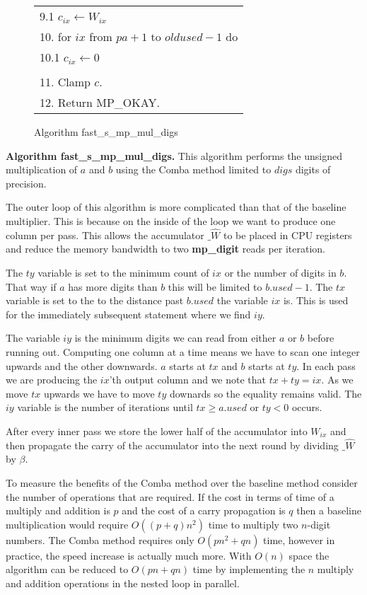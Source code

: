\documentclass[b5paper]{book}
\begin{document}
\begin{figure}[!here]
\begin{small}
\begin{center}
\begin{tabular}{l}
\hspace{3mm}9.1  $c_{ix} \leftarrow W_{ix}$ \\
10.  for $ix$ from $pa + 1$ to $oldused - 1$ do \\
\hspace{3mm}10.1 $c_{ix} \leftarrow 0$ \\
\\
11.  Clamp $c$. \\
12.  Return MP\_OKAY. \\
\hline
\end{tabular}
\end{center}
\end{small}
\caption{Algorithm fast\_s\_mp\_mul\_digs}
\label{fig:COMBAMULT}
\end{figure}

\textbf{Algorithm fast\_s\_mp\_mul\_digs.}
This algorithm performs the unsigned multiplication of $a$ and $b$ using the Comba method limited to $digs$ digits of precision.

The outer loop of this algorithm is more complicated than that of the baseline multiplier.  This is because on the inside of the 
loop we want to produce one column per pass.  This allows the accumulator $\_ \hat W$ to be placed in CPU registers and
reduce the memory bandwidth to two \textbf{mp\_digit} reads per iteration.

The $ty$ variable is set to the minimum count of $ix$ or the number of digits in $b$.  That way if $a$ has more digits than
$b$ this will be limited to $b.used - 1$.  The $tx$ variable is set to the to the distance past $b.used$ the variable
$ix$ is.  This is used for the immediately subsequent statement where we find $iy$.  

The variable $iy$ is the minimum digits we can read from either $a$ or $b$ before running out.  Computing one column at a time
means we have to scan one integer upwards and the other downwards.  $a$ starts at $tx$ and $b$ starts at $ty$.  In each
pass we are producing the $ix$'th output column and we note that $tx + ty = ix$.  As we move $tx$ upwards we have to 
move $ty$ downards so the equality remains valid.  The $iy$ variable is the number of iterations until 
$tx \ge a.used$ or $ty < 0$ occurs.

After every inner pass we store the lower half of the accumulator into $W_{ix}$ and then propagate the carry of the accumulator
into the next round by dividing $\_ \hat W$ by $\beta$.

To measure the benefits of the Comba method over the baseline method consider the number of operations that are required.  If the 
cost in terms of time of a multiply and addition is $p$ and the cost of a carry propagation is $q$ then a baseline multiplication would require 
$O \left ((p + q)n^2 \right )$ time to multiply two $n$-digit numbers.  The Comba method requires only $O(pn^2 + qn)$ time, however in practice, 
the speed increase is actually much more.  With $O(n)$ space the algorithm can be reduced to $O(pn + qn)$ time by implementing the $n$ multiply
and addition operations in the nested loop in parallel.  
\end{document}
